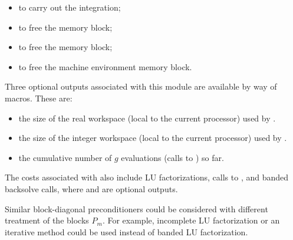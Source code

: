 \begin{itemize}
\item  {} 
  to carry out the integration;
  
\item  {} 
  to free the {\cvbbdpre} memory block;
  
\item  {} 
  to free the {\cvodes} memory block;
  
\item  {}
  to free the machine environment memory block.

\end{itemize}

\noindent Three optional outputs associated with this module are available by way of
macros. 
These are:
\begin{itemize}
\item  {} the size of the real workspace (local to
  the current processor) used by {\cvbbdpre}.
\item  {} the size of the integer workspace (local to
  the current processor) used by {\cvbbdpre}.
\item  {} the cumulative number of $g$ evaluations (calls
  to ) so far.
\end{itemize}

The costs associated with {\cvbbdpre} also include  LU
factorizations,  calls to , and  banded
backsolve calls, where  and  are optional {\cvodes}
outputs.

Similar block-diagonal preconditioners could be considered with different
treatment of the blocks $P_m$. For example, incomplete LU factorization or
an iterative method could be used instead of banded LU factorization.

